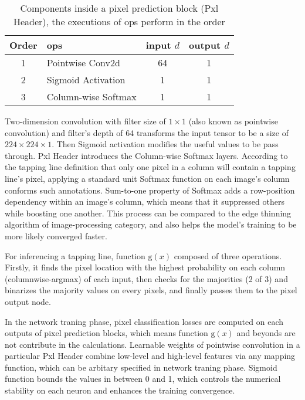 \documentclass[default,pdflatex,iicol]{sn-jnl}%
\begin{document}
\begin{table}[]
\centering
\caption{Components inside a pixel prediction block (Pxl Header), the executions of ops perform in the order}
\label{tab-pxlheader}
\begin{minipage}{\linewidth}
\begin{center}
\begin{tabular}{@{}clcc@{}}%
Order 	& ops 	& \textbf{input} $d$\footnotemark[1]  & \textbf{output} $d$\footnotemark[1]	\\ \midrule
1	& Pointwise Conv2d	& 64  & 1 \\
2	& Sigmoid Activation	& 1  & 1 \\
3	& Column-wise Softmax   & 1 & 1 \\ \bottomrule
\end{tabular}%
\end{center}
\end{minipage}
\end{table}

Two-dimension convolution with filter size of $1\times1$ (also known as pointwise convolution) and filter's depth of 64 transforms the input tensor to be a size of $224\times 224 \times 1$.  Then Sigmoid activation modifies the useful values to be pass through. Pxl Header introduces the Column-wise Softmax layers. According to the tapping line definition that only one pixel in a column will contain a tapping line's pixel, applying a standard unit Softmax function on each image's column conforms such annotations. Sum-to-one property of Softmax adds a row-position dependency within an image's column, which means that it suppressed others while boosting one another. This process can be compared to the edge thinning algorithm of image-processing category, and also helps the model's training to be more likely converged faster. 

For inferencing a tapping line, function $\mathrm{g}(x)$ composed of three operations. Firstly, it finds the pixel location with the highest probability on each column (columnwise-argmax) of each input, then checks for the majorities (2 of 3) and binarizes the majority values on every pixels, and finally passes them to the pixel output node. 

In the network traning phase, pixel classification losses are computed on each outputs of pixel prediction blocks, which means function $\mathrm{g}(x)$ and beyonds are not contribute in the calculations. Learnable weights of pointwise convolution in a particular Pxl Header combine low-level and high-level features via any mapping function, which can be arbitary specified in network traning phase. Sigmoid function bounds the values in between 0 and 1, which controls the numerical stability on each neuron and enhances the training convergence.
\end{document}

